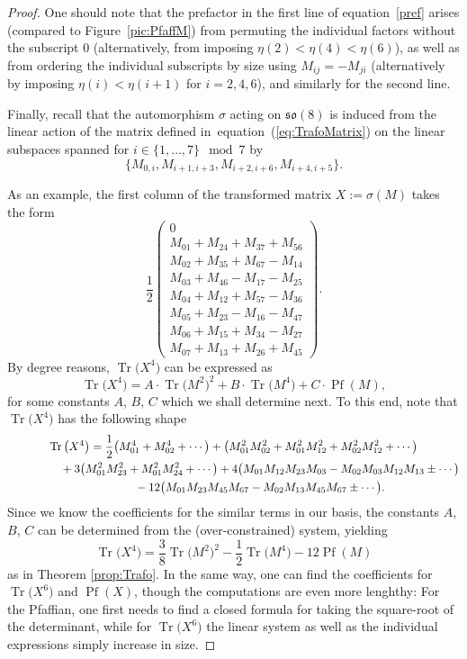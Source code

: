 \documentclass[pdftex]{sigma}
\numberwithin{equation}{section}
\newcommand{\Pf}{\operatorname{Pf}}
\newcommand{\Tr}{\operatorname{Tr}}
\begin{document}
\begin{proof}
One should note that the prefactor in the first line of equation~\eqref{pref} arises
(compared to Figure~\ref{pic:PfaffM})
 from permuting the individual factors without the subscript $0$ (alternatively, from imposing $\eta(2) < \eta(4) < \eta(6)$), as well as from ordering the individual subscripts by size using $M_{ij} = -M_{ji}$ (alternatively by imposing $\eta(i) < \eta(i+1)$ for $i=2,4,6$), and similarly for the second line.

 Finally, recall that the automorphism $\sigma$ acting on $\mathfrak{so}(8)$ is induced from the linear action of the matrix defined in~equation~(\ref{eq:TrafoMatrix}) on the linear subspaces spanned for $i \in \{1,\dots,7\} \mod 7$ by
\[
\{M_{0,i}, M_{i+1,i+3}, M_{i+2,i+6}, M_{i+4,i+5} \}.
\]

As an example, the first column of the transformed matrix $X:= \sigma(M)$ takes the form
\[\frac{1}{2}\left(
\begin{matrix}
 0 \\
 M_{01} + M_{24} + M_{37} + M_{56} \\
 M_{02} + M_{35} + M_{67} - M_{14} \\
 M_{03} + M_{46} - M_{17} - M_{25} \\
 M_{04} + M_{12} + M_{57} - M_{36} \\
 M_{05} + M_{23} - M_{16} - M_{47} \\
 M_{06} + M_{15} + M_{34} - M_{27} \\
 M_{07} + M_{13} + M_{26} + M_{45}
\end{matrix}
\right).
\]
By degree reasons, $ \Tr \big(X^4\big)$ can be expressed as \begin{equation*}
 \Tr \big(X^4\big) = A \cdot \Tr \big(M^2\big)^2 + B \cdot \Tr \big(M^4\big) + C \cdot \Pf (M),
\end{equation*}
for some constants $A$, $B$, $C$ which we shall determine next. To this end, note that $\Tr \big(X^4\big)$ has the following shape
\begin{gather*}
 \Tr\big(X^4\big)= \frac{1}{2} \big( M_{01}^4 + M_{02}^4 + \cdots \big)
 +\big( M_{01}^2 M_{02}^2 + M_{01}^2 M_{12}^2 + M_{02}^2 M_{12}^2 + \cdots\big) \\
\hphantom{\Tr\big(X^4\big)=}{}
+ 3 \big( M_{01}^2 M_{23}^2 + M_{01}^2 M_{24}^2 + \cdots \big)
 + 4 \big( M_{01} M_{12} M_{23} M_{03} - M_{02} M_{03} M_{12} M_{13} \pm \cdots \big) \\
\hphantom{\Tr\big(X^4\big)=}{} -12 \big( M_{01} M_{23} M_{45} M_{67} - M_{02} M_{13} M_{45} M_{67} \pm \cdots \big).
\end{gather*}
Since we know the coefficients for the similar terms in our basis, the constants $A$, $B$, $C$ can be determined from the (over-constrained) system, yielding
\[
\Tr \big(X^4\big) = \frac{3}{8} \Tr \big(M^2\big)^2 - \frac{1}{2} \Tr \big(M^4\big) - 12 \Pf (M) \] as in Theorem \ref{prop:Trafo}. In the same way, one can find the coefficients for $\Tr \big(X^6\big)$ and $\Pf (X)$, though the computations are even more lenghthy: For the Pfaffian, one first needs to find a closed formula for taking the square-root of the determinant, while for $\Tr \big(X^6\big)$ the linear system as well as the individual expressions simply increase in size.
\end{proof}
\end{document}
